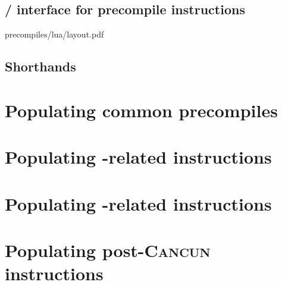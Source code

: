 \subsection{\hubMod{} / \oobMod{} interface for precompile instructions}   \label{oob: hub / oob interface for precompiles}   {precompiles/lua/layout.pdf}
\subsection{Shorthands}                                                    \label{oob: populating: shorthands}               
\section{Populating common precompiles}                                    \label{oob: populating: common precompiles}       
\section{Populating \instModexp{}-related \oobMod{} instructions}          \label{oob: populating: modexp}                   
\section{Populating \instBlake{}-related \oobMod{} instructions}           \label{oob: populating: blake2f}                  
\section{Populating post-\textsc{Cancun} \oobMod{} instructions}           \label{oob: populating: post cancun}              
